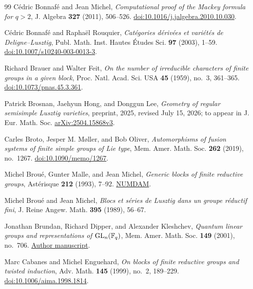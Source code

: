 \begin{thebibliography}{99}
C\'edric Bonnaf\'e and Jean Michel,
\emph{Computational proof of the Mackey formula for \(q>2\)},
J. Algebra \textbf{327} (2011), 506--526.
\href{https://doi.org/10.1016/j.jalgebra.2010.10.030}{doi:10.1016/j.jalgebra.2010.10.030}.

C\'edric Bonnaf\'e and Rapha\"el Rouquier,
\emph{Cat\'egories d\'eriv\'ees et vari\'et\'es de Deligne--Lusztig},
Publ. Math. Inst. Hautes \'Etudes Sci. \textbf{97} (2003), 1--59.
\href{https://doi.org/10.1007/s10240-003-0013-3}{doi:10.1007/s10240-003-0013-3}.

Richard Brauer and Walter Feit,
\emph{On the number of irreducible characters of finite groups in a given block},
Proc. Natl. Acad. Sci. USA \textbf{45} (1959), no.~3, 361--365.
\href{https://doi.org/10.1073/pnas.45.3.361}{doi:10.1073/pnas.45.3.361}.

Patrick Brosnan, Jaehyun Hong, and Donggun Lee,
\emph{Geometry of regular semisimple Lusztig varieties},
preprint, 2025, revised July 15, 2026;
to appear in J. Eur. Math. Soc.
\href{https://arxiv.org/abs/2504.15868v3}{arXiv:2504.15868v3}.

Carles Broto, Jesper M. M\o ller, and Bob Oliver,
\emph{Automorphisms of fusion systems of finite simple groups of Lie type},
Mem. Amer. Math. Soc. \textbf{262} (2019), no.~1267.
\href{https://doi.org/10.1090/memo/1267}{doi:10.1090/memo/1267}.

Michel Brou\'e, Gunter Malle, and Jean Michel,
\emph{Generic blocks of finite reductive groups},
Ast\'erisque \textbf{212} (1993), 7--92.
\href{https://www.numdam.org/item/AST_1993__212__7_0/}{NUMDAM}.

Michel Brou\'e and Jean Michel,
\emph{Blocs et s\'eries de Lusztig dans un groupe r\'eductif fini},
J. Reine Angew. Math. \textbf{395} (1989), 56--67.

Jonathan Brundan, Richard Dipper, and Alexander Kleshchev,
\emph{Quantum linear groups and representations of \(\operatorname{GL}_n(\mathbb F_q)\)},
Mem. Amer. Math. Soc. \textbf{149} (2001), no.~706.
\href{https://pages.uoregon.edu/brundan/papers/gl.pdf}{Author manuscript}.

Marc Cabanes and Michel Enguehard,
\emph{On blocks of finite reductive groups and twisted induction},
Adv. Math. \textbf{145} (1999), no.~2, 189--229.
\href{https://doi.org/10.1006/aima.1998.1814}{doi:10.1006/aima.1998.1814}.


\end{thebibliography}
